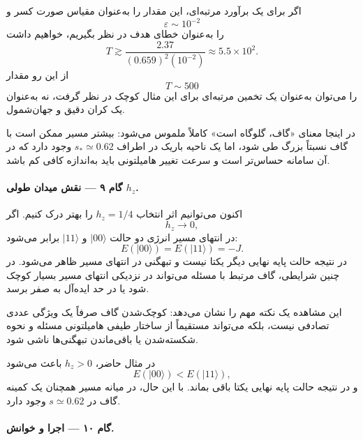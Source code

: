 اگر برای یک برآورد مرتبه‌ای، این مقدار را به‌عنوان مقیاس صورت کسر و
\begin{equation}
	\varepsilon\sim10^{-2}
\end{equation}
را به‌عنوان خطای هدف در نظر بگیریم، خواهیم داشت
\begin{equation}
	T
	\gtrsim
	\frac{2.37}
	{(0.659)^2(10^{-2})}
	\approx
	5.5\times10^2.
\end{equation}
از این رو مقدار
\begin{equation}
	T\sim500
\end{equation}
را می‌توان به‌عنوان یک تخمین مرتبه‌ای برای این مثال کوچک در نظر گرفت، نه به‌عنوان یک کران دقیق و جهان‌شمول.

در اینجا معنای «گاف، گلوگاه است» کاملاً ملموس می‌شود: بیشتر مسیر ممکن است با گاف نسبتاً بزرگ طی شود، اما یک ناحیه باریک در اطراف $s_*\simeq0.62$ وجود دارد که در آن سامانه حساس‌تر است و سرعت تغییر هامیلتونی باید به‌اندازه کافی کم باشد.

\paragraph{گام ۹ --- نقش میدان طولی $h_z$.}

اکنون می‌توانیم اثر انتخاب $h_z=1/4$ را بهتر درک کنیم. اگر
\begin{equation}
	h_z\rightarrow0,
\end{equation}
در انتهای مسیر انرژی دو حالت
$\lvert00\rangle$ و $\lvert11\rangle$
برابر می‌شود:
\begin{equation}
	E(\lvert00\rangle)
	=
	E(\lvert11\rangle)
	=
	-J.
\end{equation}
در نتیجه حالت پایه نهایی دیگر یکتا نیست و تبهگنی در انتهای مسیر ظاهر می‌شود. در چنین شرایطی، گاف مرتبط با مسئله می‌تواند در نزدیکی انتهای مسیر بسیار کوچک شود یا در حد ایده‌آل به صفر برسد.

این مشاهده یک نکته مهم را نشان می‌دهد: کوچک‌شدن گاف صرفاً یک ویژگی عددی تصادفی نیست، بلکه می‌تواند مستقیماً از ساختار طیفی هامیلتونی مسئله و نحوه شکسته‌شدن یا باقی‌ماندن تبهگنی‌ها ناشی شود.

در مثال حاضر، $h_z>0$ باعث می‌شود
\begin{equation}
	E(\lvert00\rangle)
	<
	E(\lvert11\rangle),
\end{equation}
و در نتیجه حالت پایه نهایی یکتا باقی بماند. با این حال، در میانه مسیر همچنان یک کمینه گاف در
$s\simeq0.62$
وجود دارد.

\paragraph{گام ۱۰ --- اجرا و خوانش.}

